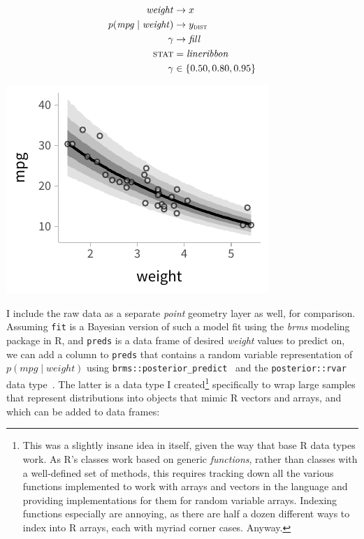 \documentclass[journal]{vgtc}              %
\begin{document}
\noindent
\begin{minipage}{.5\columnwidth}

\begin{align*}
\mathit{weight} &\rightarrow x\\
p(\mathit{mpg} \mid \mathit{weight}) &\rightarrow y_\textsc{dist}\\
\gamma &\rightarrow \mathit{fill}\\
\textsc{stat} &= \mathit{lineribbon}\\
\gamma &\in \{0.50, 0.80, 0.95\}
\end{align*}
\end{minipage}%
  \begin{minipage}{.4\columnwidth}
    \centering
    \includegraphics[width=1.2\columnwidth]{figs/3-lineribbon.pdf}
  \end{minipage}
\hfill\break


I include the raw data as a separate \textit{point} geometry layer as well, for comparison. Assuming \texttt{fit}  is a Bayesian version of such a model fit using the \textit{brms} modeling package in R, and \texttt{preds} is a data frame of desired \textit{weight} values to predict on, we can add a column to \texttt{preds} that contains a random variable representation of $p(\mathit{mpg} \mid \mathit{weight})$ using \texttt{brms::posterior\_predict}~\cite{burkner2018brms} and the \texttt{posterior::rvar}  data type~\cite{burkner2022posterior}. The latter is a data type I created\footnote{This was a slightly insane idea in itself, given the way that base R data types work. As R's classes work based on generic \textit{functions}, rather than classes with a well-defined set of methods, this requires tracking down all the various functions implemented to work with arrays and vectors in the language and providing implementations for them for random variable arrays. Indexing functions especially are annoying, as there are half a dozen different ways to index into R arrays, each with myriad corner cases. Anyway.} specifically to wrap large samples that represent distributions into objects that mimic R vectors and arrays, and which can be added to data frames:
\end{document}
